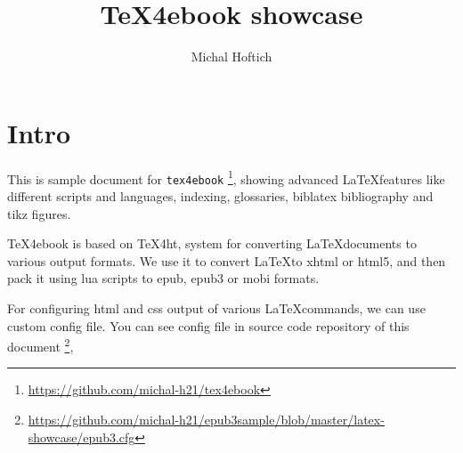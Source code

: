 \documentclass{article}
\begin{document}
	\title{TeX4ebook showcase}
	\author{Michal Hoftich}
	\maketitle
	\tableofcontents
	\section{Intro}

	This is sample document for \verb|tex4ebook|%
	\footnote{\url{https://github.com/michal-h21/tex4ebook}}, 
	showing advanced \LaTeX features like different scripts and languages, 
	indexing, glossaries, biblatex bibliography and tikz figures.
	
	TeX4ebook is based on TeX4ht, system for converting \LaTeX documents to 
	various output formats. We use it to convert \LaTeX to xhtml or html5, 
	and then pack it using lua scripts to epub, epub3 or mobi formats.

	For configuring html and css output of various \LaTeX commands, 
	we can use custom config file. You can see config file in source code
	repository of this document%
	\footnote{\url{https://github.com/michal-h21/epub3sample/blob/master/latex-showcase/epub3.cfg}},
	
	
	\printglossaries
	\printbibliography
	\printindex
\end{document}
